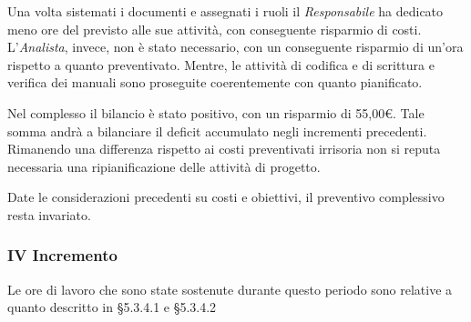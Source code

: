 Una volta sistemati i documenti e assegnati i ruoli il \textit{Responsabile} ha dedicato meno ore del previsto alle sue attività, con conseguente risparmio di costi. L'\textit{Analista}, invece, non è stato necessario, con un conseguente risparmio di un'ora rispetto a quanto preventivato. 
Mentre, le attività di codifica e di scrittura e verifica dei manuali sono proseguite coerentemente con quanto pianificato.

Nel complesso il bilancio è stato positivo, con un risparmio di 55,00\euro. Tale somma andrà a bilanciare il deficit accumulato negli incrementi precedenti. Rimanendo una differenza rispetto ai costi preventivati irrisoria non si reputa necessaria una ripianificazione delle attività di progetto.

Date le considerazioni precedenti su costi e obiettivi, il preventivo complessivo resta invariato.


\pagebreak


\subsubsection{IV Incremento}
Le ore di lavoro che sono state sostenute durante questo periodo sono relative a quanto descritto in §5.3.4.1 e §5.3.4.2

